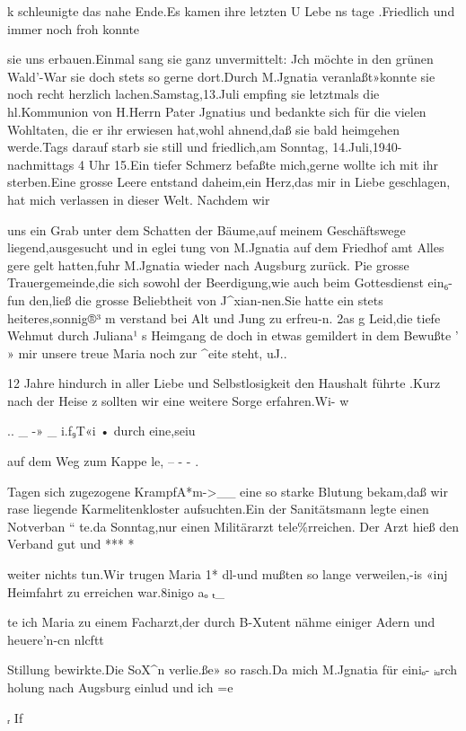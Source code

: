 \documentclass[a4paper,11pt]{article}
\begin{document}
k schleunigte das nahe Ende.Es kamen ihre letzten U Lebe ns tage .Friedlich und immer noch froh konnte

  sie uns erbauen.Einmal sang sie ganz unvermittelt: Jch möchte in den grünen Wald'-War sie doch stets so gerne dort.Durch M.Jgnatia veranlaßt»konnte sie noch recht herzlich lachen.Samstag,13.Juli empfing sie letztmals die hl.Kommunion von H.Herrn Pater Jgnatius und bedankte sich für die vielen Wohltaten, die er ihr erwiesen hat,wohl ahnend,daß sie bald heimgehen werde.Tags darauf starb sie still und friedlich,am Sonntag, 14.Juli,1940-nachmittags 4 Uhr 15.Ein tiefer Schmerz befaßte mich,gerne wollte ich mit ihr sterben.Eine grosse Leere entstand daheim,ein Herz,das mir in Liebe geschlagen, hat mich verlassen in dieser Welt.	Nachdem wir

  uns ein Grab unter dem Schatten der Bäume,auf meinem Geschäftswege liegend,ausgesucht und in eglei tung von M.Jgnatia auf dem Friedhof amt Alles gere gelt hatten,fuhr M.Jgnatia wieder nach Augsburg zurück. Pie grosse Trauergemeinde,die sich sowohl der Beerdigung,wie auch beim Gottesdienst ein₆-fun den,ließ die grosse Beliebtheit von J^xian-nen.Sie hatte ein stets heiteres,sonnig®³ m verstand bei Alt und Jung zu erfreu-n. 2as g Leid,die tiefe Wehmut durch Juliana¹ s Heimgang de doch in etwas gemildert in dem Bewußte ' » mir unsere treue Maria noch zur ^eite steht, uJ..

   12 Jahre hindurch in aller Liebe und Selbstlosigkeit den Haushalt führte .Kurz nach der Heise z sollten wir eine weitere Sorge erfahren.Wi- w

  ..	_	-» _ i.f₉T«i • durch eine,seiu

  auf dem Weg zum Kappe le, --	- -	.

  Tagen sich zugezogene KrampfA*m->__ eine so starke Blutung bekam,daß wir rase liegende Karmelitenkloster aufsuchten.Ein der Sanitätsmann legte einen Notverban “ te.da Sonntag,nur einen Militärarzt tele^^erreichen. Der Arzt hieß den Verband gut und ***	*

   weiter nichts tun.Wir trugen Maria 1* dl-und mußten so lange verweilen,-is «inj Heimfahrt zu erreichen war.8inigo aₒ	ₜ_

te ich Maria zu einem Facharzt,der durch B-Xutent nähme einiger Adern und heuere'n-cn	nlcftt

Stillung bewirkte.Die SoX^n verlie.ße» so rasch.Da mich M.Jgnatia für einiₒ- ᵢᵤrch holung nach Augsburg einlud und ich =e

ᵣ	If
\end{document}
